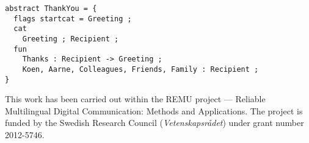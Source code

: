 






\begin{verbatim}
abstract ThankYou = {
  flags startcat = Greeting ;
  cat 
    Greeting ; Recipient ;
  fun
    Thanks : Recipient -> Greeting ;
    Koen, Aarne, Colleagues, Friends, Family : Recipient ;
}
\end{verbatim}


\vfill\noindent
This work has been carried out within the REMU project — Reliable Multilingual Digital Communication: Methods and Applications.
The project is funded by the Swedish Research Council (\emph{Vetenskapsrådet}) under grant number 2012-5746.

